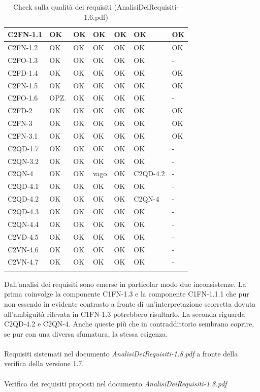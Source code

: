 \begin{footnotesize}
\begin{longtable}{|p{}|p{}|p{}|p{}|p{}|p{}|p{}|}
 C2FN-1.1&  OK&  OK&  OK&  OK&  OK& OK\\ \hline
 C2FN-1.2&  OK&  OK&  OK&  OK&  OK& OK\\ \hline
 C2FO-1.3&  OK&  OK&  OK&  OK&  OK& -\\ \hline
 C2FD-1.4&  OK&  OK&  OK&  OK&  OK& OK\\ \hline
 C2FN-1.5&  OK&  OK&  OK&  OK&  OK& OK\\ \hline
 C2FO-1.6&  OPZ.&  OK&  OK&  OK&  OK& -\\ \hline
 C2FD-2&  OK&  OK&  OK&  OK&  OK& OK\\ \hline
 C2FN-3&  OK&  OK&  OK&  OK&  OK& OK\\ \hline
 C2FN-3.1&  OK&  OK&  OK&  OK&  OK& OK\\ \hline
 C2QD-1.7&  OK&  OK&  OK&  OK&  OK& -\\ \hline
 C2QN-3.2&  OK&  OK&  OK&  OK&  OK& -\\ \hline
 C2QN-4&  OK&  OK&  vago&  OK&  C2QD-4.2& -\\ \hline
 C2QD-4.1&  OK&  OK&  OK&  OK&  OK& -\\ \hline
 C2QD-4.2&  OK&  OK&  OK&  OK&  C2QN-4& -\\ \hline
 C2QD-4.3&  OK&  OK&  OK&  OK&  OK& -\\ \hline
 C2QN-4.4& OK&  OK&  OK&  OK&  OK& -\\ \hline
 C2VD-4.5&  OK&  OK&  OK&  OK&  OK& -\\ \hline
 C2VN-4.6&  OK&  OK&  OK&  OK&  OK& -\\ \hline
 C2VN-4.7&  OK&  OK&  OK&  OK&  OK& -\\ \hline
 
\caption{Check sulla qualit\`a dei requisiti (AnalisiDeiRequisiti-1.6.pdf)}
\end{longtable}
\end{footnotesize}

Dall'analisi dei requisiti sono emerse in particolar modo due inconsistenze. La
prima coinvolge la componente C1FN-1.3 e la componente C1FN-1.1.1 che pur non
essendo in evidente contrasto a fronte di un'interpretazione scorretta dovuta
all'ambiguit\`a rilevata in C1FN-1.3 potrebbero risultarlo.
La seconda riguarda C2QD-4.2 e C2QN-4. Anche queste pi\`u che in contraddittorio
sembrano coprire, se pur con una diversa sfumatura, la stessa esigenza.
\\\\
Requisiti sistemati nel documento \emph{AnalisiDeiRequisiti-1.8.pdf} a fronte
della verifica della versione 1.7.
\\\\
Verifica dei requisiti proposti nel documento \emph{AnalisiDeiRequisiti-1.8.pdf}

